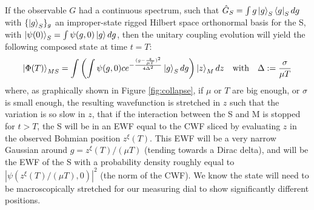 \documentclass[11pt, a4paper]{article} %
\begin{document}
If the observable $G$ had a continuous spectrum, such that $\hat{G}_S=\int g\ket{g}_S\bra{g}_Sdg$ with $\{\ket{g}_S\}_g$ an improper-state rigged Hilbert space orthonormal basis for the S, with $\ket{\psi(0)}_S=\int\psi(g,0)\ket{g}dg$, then the unitary coupling evolution will yield the following composed state at time $t=T$:
\begin{equation}\label{postM2}
\ket{\Phi(T)}_{MS}=\int\qty(\int\psi(g,0) c e^{-\frac{(g-\frac{z}{\mu T})^2}{4\Delta^2}}\ket{g}_S dg)\ket{z}_Mdz\quad \text{with} \quad \Delta:=\frac{\sigma}{\mu T}
\end{equation}
where, as graphically shown in Figure \ref{fig:collapse}, if $\mu$ or $T$ are big enough, or $\sigma$ is small enough, the resulting wavefunction is stretched in $z$ such that the variation is so slow in $z$, that if the interaction between the S and M is stopped for $t>T$, the S will be in an EWF equal to the CWF sliced by evaluating $z$ in the observed Bohmian position $z^\xi(T)$. This EWF will be a very narrow Gaussian around $g=z^\xi(T)/(\mu T)$ (tending towards a Dirac delta), and will be the EWF of the S with a probability density roughly equal to $|\psi(z^\xi(T)/(\mu T),0)|^2$ (the norm of the CWF). We know the state will need to be macroscopically stretched for our measuring dial to show significantly different positions.\vspace{-0.2cm}
\end{document}
